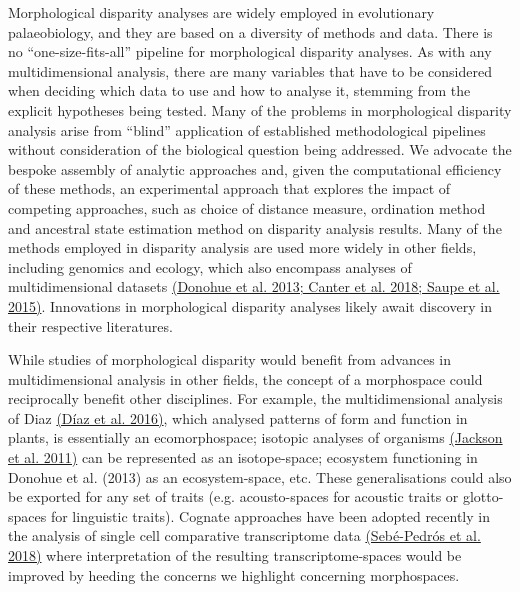 \documentclass[12pt,letterpaper]{article}
\begin{document}
Morphological disparity analyses are widely employed in evolutionary palaeobiology, and they are based on a diversity of methods and data.
There is no ``one-size-fits-all'' pipeline for morphological disparity analyses.
As with any multidimensional analysis, there are many variables that have to be considered when deciding which data to use and how to analyse it, stemming from the explicit hypotheses being tested.
Many of the problems in morphological disparity analysis arise from ``blind'' application of established methodological pipelines without consideration of the biological question being addressed.
We advocate the bespoke
assembly of analytic approaches and, given the computational efficiency of these methods, an experimental approach that explores the impact of competing approaches, such as choice of distance measure, ordination method and ancestral state estimation method on disparity analysis results.
Many of the methods employed in disparity analysis are used more widely in other fields, including genomics and ecology, which also encompass analyses of multidimensional datasets \href{https://paperpile.com/c/sTGYvp/krNU+60H0+cV3v}{(Donohue et al. 2013; Canter et al. 2018; Saupe et al. 2015)}. %
Innovations in morphological disparity analyses likely await discovery in their respective literatures.

While studies of morphological disparity would benefit from advances in multidimensional analysis in other fields, the concept of a morphospace could reciprocally benefit other disciplines.
For example, the multidimensional analysis of Diaz \href{https://paperpile.com/c/sTGYvp/47fI}{(Díaz et al. 2016)}, which analysed patterns of form and function in plants, is essentially an ecomorphospace; isotopic analyses of organisms \href{https://paperpile.com/c/sTGYvp/PwyQ}{(Jackson et al. 2011)} can be represented as an isotope-space; ecosystem functioning in Donohue et al. (2013) as an ecosystem-space, etc.
These generalisations could also be exported for any set of traits (e.g. acousto-spaces for acoustic traits or glotto-spaces for linguistic traits).
Cognate approaches have been adopted recently in the analysis of single cell comparative transcriptome data \href{https://paperpile.com/c/sTGYvp/856K}{(Sebé-Pedrós et al. 2018)} where interpretation of the resulting transcriptome-spaces would be improved by heeding the concerns we highlight concerning morphospaces.
\end{document}
